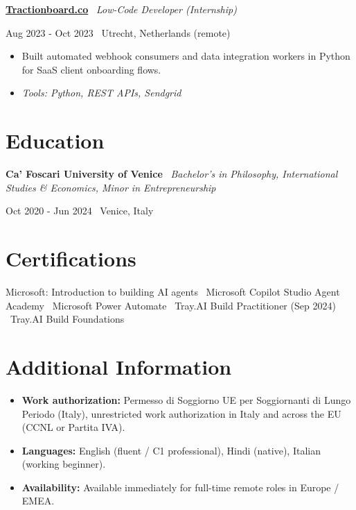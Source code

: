 \documentclass[a4paper,10pt]{article}
\newcommand{\role}[4]{%
  \vspace{2pt}\noindent
  \begin{minipage}[t]{0.70\textwidth}\raggedright\textbf{#1} \textbullet\ \textit{#3}\end{minipage}%
  \hfill
  \begin{minipage}[t]{0.28\textwidth}\raggedleft\footnotesize\color{gray}#2 \textbullet\ #4\end{minipage}%
  \vspace{1pt}%
}
\begin{document}
\role{\href{https://tractionboard.co}{Tractionboard.co}}{Aug 2023 - Oct 2023}{Low-Code Developer (Internship)}{Utrecht, Netherlands (remote)}
\begin{itemize}
  \item Built automated webhook consumers and data integration workers in Python for SaaS client onboarding flows.
  \item \textit{Tools: Python, REST APIs, Sendgrid}
\end{itemize}

\section{Education}
\role{Ca' Foscari University of Venice}{Oct 2020 - Jun 2024}{Bachelor's in Philosophy, International Studies \& Economics, Minor in Entrepreneurship}{Venice, Italy}

\section{Certifications}
Microsoft: Introduction to building AI agents \textbullet\ Microsoft Copilot Studio Agent Academy \textbullet\ Microsoft Power Automate \textbullet\ Tray.AI Build Practitioner (Sep 2024) \textbullet\ Tray.AI Build Foundations

\section{Additional Information}
\begin{itemize}
  \item \textbf{Work authorization:} Permesso di Soggiorno UE per Soggiornanti di Lungo Periodo (Italy), unrestricted work authorization in Italy and across the EU (CCNL or Partita IVA).
  \item \textbf{Languages:} English (fluent / C1 professional), Hindi (native), Italian (working beginner).
  \item \textbf{Availability:} Available immediately for full-time remote roles in Europe / EMEA.
\end{itemize}

\end{document}
